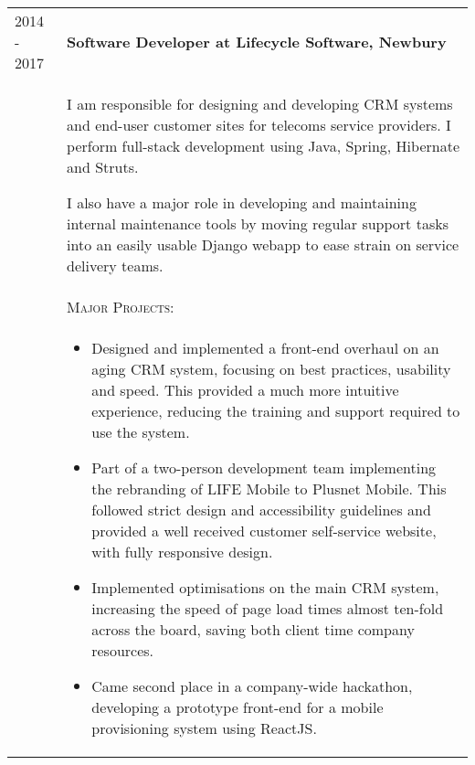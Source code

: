 \begin{tabular}{p{60pt}|p{11cm}}
	\hspace*{\fill}\textsc{2014 - 2017} & \textbf{Software Developer at Lifecycle Software, Newbury} \\
	
	\hspace*{\fill}& \small{
		I am responsible for designing and developing CRM systems and end-user customer sites for telecoms service providers. I perform full-stack development using Java, Spring, Hibernate and Struts.

		I also have a major role in developing and maintaining internal maintenance tools by moving regular support tasks into an easily usable Django webapp to ease strain on service delivery teams.
	} \\

	\ & \vspace{1pt}\textsc{Major Projects}: \\

	&\vspace{-0.9em}\begin{itemize}[itemsep=0pt,topsep=0pt,leftmargin=*]\small
		\item Designed and implemented a front-end overhaul on an aging CRM system, focusing on best practices, usability and speed. This provided a much more intuitive experience, reducing the training and support required to use the system.
		\item Part of a two-person development team implementing the rebranding of LIFE Mobile to Plusnet Mobile. This followed strict design and accessibility guidelines and provided a well received customer self-service website, with fully responsive design. 
		\item Implemented optimisations on the main CRM system, increasing the speed of page load times almost ten-fold across the board, saving both client time company resources.
		\item Came second place in a company-wide hackathon, developing a prototype front-end for a mobile provisioning system using ReactJS.
	\end{itemize}\vspace{-1.5em}

\end{tabular}